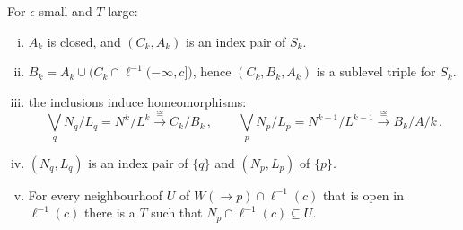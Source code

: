 \begin{lemma}\label{lem:morseFilt-globalTriple}
	For $\epsilon$ small and $T$ large: 
	\begin{enumerate}[(i)]
		\item $A_k$ is closed, and $(C_k,A_k)$ is an index pair of $S_k$.
		\item $B_k=A_k\cup \big(C_k \cap \ell^{-1}(-\infty,c]\big)$, hence $(C_k,B_k,A_k)$ is a sublevel triple for $S_k$.
		\item the inclusions induce homeomorphisms:
			\begin{equation*}
				\bigvee_q N_q/L_q = N^k/L^k \xrightarrow{\ \cong \ } C_k/B_k\,,\qquad
				\bigvee_p N_p/L_p = N^{k-1}/L^{k-1} \xrightarrow{\ \cong \ }B_k/A/k\,. 
			\end{equation*}
		\item $(N_q,L_q)$ is an index pair of $\{ q\}$ and $(N_p,L_p)$ of $\{p\}$.
		\item For every neighbourhoof $U$ of $W(\to p)\cap \ell^{-1}(c)$ that is open in $\ell^{-1}(c)$ there is a $T$ such that $N_p\cap \ell^{-1}(c)\subseteq U$.
	\end{enumerate}
\end{lemma}
